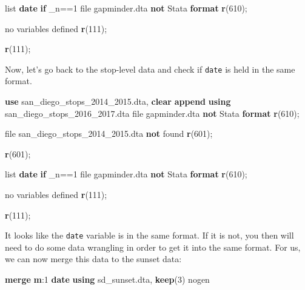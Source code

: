 \documentclass[
]{book}
\newenvironment{Shaded}{\begin{snugshade}}{\end{snugshade}}
\newcommand{\DataTypeTok}[1]{\textcolor[rgb]{0.13,0.29,0.53}{#1}}
\newcommand{\FunctionTok}[1]{\textcolor[rgb]{0.13,0.29,0.53}{\textbf{#1}}}
\newcommand{\KeywordTok}[1]{\textcolor[rgb]{0.13,0.29,0.53}{\textbf{#1}}}
\newcommand{\NormalTok}[1]{#1}
\newcommand{\OtherTok}[1]{\textcolor[rgb]{0.56,0.35,0.01}{#1}}
\begin{document}
\begin{Shaded}
\begin{Highlighting}[]
\OtherTok{list} \FunctionTok{date} \KeywordTok{if} \DataTypeTok{\_n}\NormalTok{==1}
\NormalTok{file gapminder.dta }\KeywordTok{not}\NormalTok{ Stata }\KeywordTok{format}
\FunctionTok{r}\NormalTok{(610);}


\NormalTok{no variables defined}
\FunctionTok{r}\NormalTok{(111);}

\FunctionTok{r}\NormalTok{(111);}
\end{Highlighting}
\end{Shaded}

Now, let's go back to the stop-level data and check if \texttt{date} is held in the same format.

\begin{Shaded}
\begin{Highlighting}[]
\KeywordTok{use}\NormalTok{ san\_diego\_stops\_2014\_2015.dta, }\KeywordTok{clear}
\KeywordTok{append} \KeywordTok{using}\NormalTok{ san\_diego\_stops\_2016\_2017.dta}
\NormalTok{file gapminder.dta }\KeywordTok{not}\NormalTok{ Stata }\KeywordTok{format}
\FunctionTok{r}\NormalTok{(610);}


\NormalTok{file san\_diego\_stops\_2014\_2015.dta }\KeywordTok{not}\NormalTok{ found}
\FunctionTok{r}\NormalTok{(601);}

\FunctionTok{r}\NormalTok{(601);}
\end{Highlighting}
\end{Shaded}

\begin{Shaded}
\begin{Highlighting}[]
\OtherTok{list} \FunctionTok{date} \KeywordTok{if} \DataTypeTok{\_n}\NormalTok{==1}
\NormalTok{file gapminder.dta }\KeywordTok{not}\NormalTok{ Stata }\KeywordTok{format}
\FunctionTok{r}\NormalTok{(610);}


\NormalTok{no variables defined}
\FunctionTok{r}\NormalTok{(111);}

\FunctionTok{r}\NormalTok{(111);}
\end{Highlighting}
\end{Shaded}

It looks like the \texttt{date} variable is in the same format. If it is not, you then will need to do some data wrangling in order to get it into the same format. For us, we can now merge this data to the sunset data:

\begin{Shaded}
\begin{Highlighting}[]
\KeywordTok{merge} \FunctionTok{m}\NormalTok{:1 }\FunctionTok{date} \KeywordTok{using}\NormalTok{ sd\_sunset.dta, }\KeywordTok{keep}\NormalTok{(3) nogen}
\end{Highlighting}
\end{Shaded}
\end{document}
